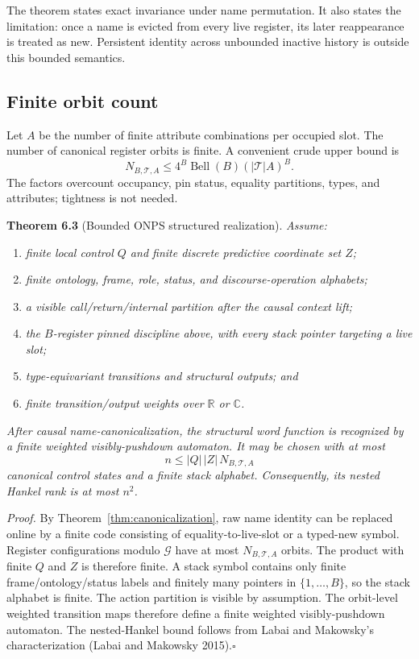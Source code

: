 \documentclass[11pt]{article}
\begin{document}
The theorem states exact invariance under name permutation. It also states the limitation: once a name is evicted from every live register, its later reappearance is treated as new. Persistent identity across unbounded inactive history is outside this bounded semantics.

\subsection{Finite orbit count}\label{finite-orbit-count}

Let \(A\) be the number of finite attribute combinations per occupied slot. The number of canonical register orbits is finite. A convenient crude upper bound is \[N_{B,\mathcal{T},A}
\leq
4^B\operatorname{Bell}(B)(|\mathcal{T}|A)^B.\] The factors overcount occupancy, pin status, equality partitions, types, and attributes; tightness is not needed.

\label{thm:bounded-realization}
\textbf{Theorem 6.3} (Bounded ONPS structured realization). \emph{Assume:}

\begin{enumerate}
\def\labelenumi{\arabic{enumi}.}
\item
  \emph{finite local control \(Q\) and finite discrete predictive coordinate set \(Z\);}
\item
  \emph{finite ontology, frame, role, status, and discourse-operation alphabets;}
\item
  \emph{a visible call/return/internal partition after the causal context lift;}
\item
  \emph{the \(B\)-register pinned discipline above, with every stack pointer targeting a live slot;}
\item
  \emph{type-equivariant transitions and structural outputs; and}
\item
  \emph{finite transition/output weights over \(\mathbb{R}\) or \(\mathbb C\).}
\end{enumerate}

\emph{After causal name-canonicalization, the structural word function is recognized by a finite weighted visibly-pushdown automaton. It may be chosen with at most \[n\leq |Q|\,|Z|\,N_{B,\mathcal{T},A}\] canonical control states and a finite stack alphabet. Consequently, its nested Hankel rank is at most \(n^2\).}

\emph{Proof.} By Theorem~\ref{thm:canonicalization}, raw name identity can be replaced online by a finite code consisting of equality-to-live-slot or a typed-new symbol. Register configurations modulo \(\mathcal{G}\) have at most \(N_{B,\mathcal{T},A}\) orbits. The product with finite \(Q\) and \(Z\) is therefore finite. A stack symbol contains only finite frame/ontology/status labels and finitely many pointers in \(\{1,\ldots,B\}\), so the stack alphabet is finite. The action partition is visible by assumption. The orbit-level weighted transition maps therefore define a finite weighted visibly-pushdown automaton. The nested-Hankel bound follows from Labai and Makowsky's characterization (Labai and Makowsky 2015).\hfill\(\square\)
\end{document}
